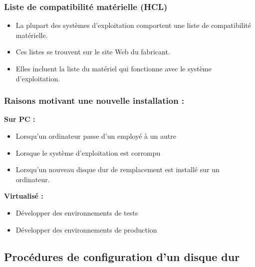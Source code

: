 	\begin{frame}[containsverbatim]
		\frametitle{Liste de compatibilité matérielle (HCL)}
		\begin{itemize}
			\item  La plupart des systèmes d’exploitation comportent
			une liste de compatibilité matérielle.
			\item Ces listes se trouvent sur le site Web du fabricant.
			\item Elles incluent la liste du matériel qui fonctionne avec
			le système d’exploitation.
		\end{itemize}
	\end{frame}
	\begin{frame}[containsverbatim]
		\frametitle{Raisons motivant une nouvelle installation :}
		\textbf{Sur PC :}
		\begin{itemize}
			\item Lorsqu’un ordinateur passe d’un employé à un autre
			\item Lorsque le système d’exploitation est corrompu
			\item Lorsqu’un nouveau disque dur de remplacement est installé sur un ordinateur.
		\end{itemize}
		\textbf{Virtualisé :}
		\begin{itemize}
			\item Développer des environnements de tests
			\item Développer des environnements de production
		\end{itemize} 
	\end{frame}
	
	\subsection{Procédures de configuration d’un disque dur}
	
